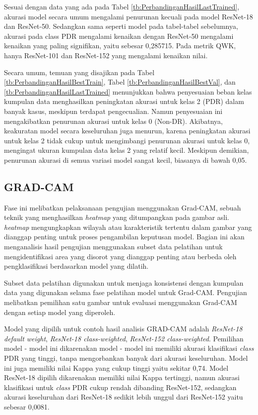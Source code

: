 Sesuai dengan data yang ada pada Tabel \ref{tb:PerbandinganHasilLastTrained}, akurasi model secara umum mengalami penurunan kecuali pada model ResNet-18 dan ResNet-50. Sedangkan sama seperti model pada tabel-tabel sebelumnya, akurasi pada class PDR mengalami kenaikan dengan ResNet-50 mengalami kenaikan yang paling signifikan, yaitu sebesar 0,285715. Pada metrik QWK, hanya ResNet-101 dan ResNet-152 yang mengalami kenaikan nilai.

Secara umum, temuan yang disajikan pada Tabel \ref{tb:PerbandinganHasilBestTrain}, Tabel \ref{tb:PerbandinganHasilBestVal}, dan \ref{tb:PerbandinganHasilLastTrained} menunjukkan bahwa penyesuaian beban kelas kumpulan data menghasilkan peningkatan akurasi untuk kelas 2 (PDR) dalam banyak kasus, meskipun terdapat pengecualian. Namun penyesuaian ini mengakibatkan penurunan akurasi untuk kelas 0 (Non-DR). Akibatnya, keakuratan model secara keseluruhan juga menurun, karena peningkatan akurasi untuk kelas 2 tidak cukup untuk mengimbangi penurunan akurasi untuk kelas 0, mengingat ukuran kumpulan data kelas 2 yang relatif kecil. Meskipun demikian, penurunan akurasi di semua variasi model sangat kecil, biasanya di bawah 0,05.

\subsection{GRAD-CAM}
\label{sec:43}
Fase ini melibatkan pelaksanaan pengujian menggunakan Grad-CAM, sebuah teknik yang menghasilkan \emph{heatmap} yang ditumpangkan pada gambar asli. \emph{heatmap} mengungkapkan wilayah atau karakteristik tertentu dalam gambar yang dianggap penting untuk proses pengambilan keputusan model. Bagian ini akan menganalisis hasil pengujian menggunakan subset data pelatihan untuk mengidentifikasi area yang disorot yang dianggap penting atau berbeda oleh pengklasifikasi berdasarkan model yang dilatih. 

Subset data pelatihan digunakan untuk menjaga konsistensi dengan kumpulan data yang digunakan selama fase pelatihan model untuk Grad-CAM. Pengujian melibatkan pemilihan satu gambar untuk evaluasi menggunakan Grad-CAM dengan setiap model yang diperoleh.

Model yang dipilih untuk contoh hasil analisis GRAD-CAM adalah \emph{ResNet-18 default weight}, \emph{ResNet-18 class-weighted}, \emph{ResNet-152 class-weighted}. Pemilihan model - model ini dikarenakan model - model ini memiliki akurasi klasifikasi \emph{class} PDR yang tinggi, tanpa mengorbankan banyak dari akurasi keseluruhan. Model ini juga memiliki nilai Kappa yang cukup tinggi yaitu sekitar 0,74. Model ResNet-18 dipilih dikarenakan memiliki nilai Kappa tertinggi, namun akurasi klasifikasi untuk \emph{class} PDR cukup rendah dibanding ResNet-152, sedangkan akurasi keseluruhan dari ResNet-18 sedikit lebih unggul dari ResNet-152 yaitu sebesar 0,0081.

